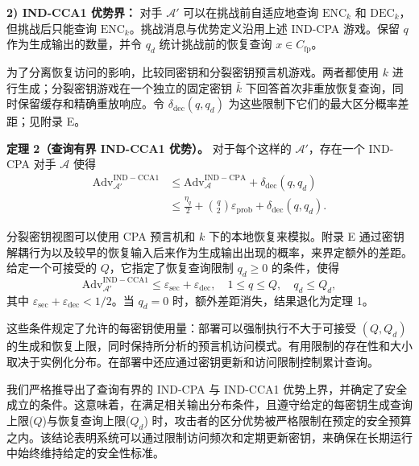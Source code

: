 \textbf{2) IND-CCA1 优势界：} 对手 \(\mathcal{A}'\) 可以在挑战前自适应地查询 \(\mathrm{ENC}_k\) 和 \(\mathrm{DEC}_k\)，但挑战后只能查询 \(\mathrm{ENC}_k\)。挑战消息与优势定义沿用上述 IND-CPA 游戏。保留 \(q\) 作为生成输出的数量，并令 \(q_d\) 统计挑战前的恢复查询 \(x \in C_{\mathrm{fp}}\)。

为了分离恢复访问的影响，比较同密钥和分裂密钥预言机游戏。两者都使用 \(k\) 进行生成；分裂密钥游戏在一个独立的固定密钥 \(\bar{k}\) 下回答首次非重放恢复查询，同时保留缓存和精确重放响应。令 \(\delta_{\mathrm{dec}}(q, q_d)\) 为这些限制下它们的最大区分概率差距；见附录 E。

\textbf{定理 2（查询有界 IND-CCA1 优势）。} 对于每个这样的 \(\mathcal{A}'\)，存在一个 IND-CPA 对手 \(\mathcal{A}\) 使得
\begin{equation}
\begin{aligned}
\mathrm{Adv}_{\mathcal{A}'}^{\mathrm{IND-CCA1}} &\le \mathrm{Adv}_{\mathcal{A}}^{\mathrm{IND-CPA}} + \delta_{\mathrm{dec}}(q, q_d) \\
&\le \frac{\eta_q}{2} + \binom{q}{2} \varepsilon_{\mathrm{prob}} + \delta_{\mathrm{dec}}(q, q_d).
\end{aligned} \tag{19}
\end{equation}

分裂密钥视图可以使用 CPA 预言机和 \(k\) 下的本地恢复来模拟。附录 E 通过密钥解耦行为以及较早的恢复输入后来作为生成输出出现的概率，来界定额外的差距。给定一个可接受的 \(Q\)，它指定了恢复查询限制 \(q_d \ge 0\) 的条件，使得
\begin{equation}
\mathrm{Adv}_{\mathcal{A}'}^{\mathrm{IND-CCA1}} \le \varepsilon_{\mathrm{sec}} + \varepsilon_{\mathrm{dec}}, \quad 1 \le q \le Q, \quad q_d \le Q_d, \tag{20}
\end{equation}
其中 \(\varepsilon_{\mathrm{sec}} + \varepsilon_{\mathrm{dec}} < 1/2\)。当 \(q_d = 0\) 时，额外差距消失，结果退化为定理 1。

这些条件规定了允许的每密钥使用量：部署可以强制执行不大于可接受 \((Q, Q_d)\) 的生成和恢复上限，同时保持所分析的预言机访问模式。有用限制的存在性和大小取决于实例化分布。在部署中还应通过密钥更新和访问限制控制累计查询。

我们严格推导出了查询有界的 IND-CPA 与 IND-CCA1 优势上界，并确定了安全成立的条件。这意味着，在满足相关输出分布条件，且遵守给定的每密钥生成查询上限($Q$)与恢复查询上限($Q_d$)
时，攻击者的区分优势被严格限制在预定的安全预算之内。该结论表明系统可以通过限制访问频次和定期更新密钥，来确保在长期运行中始终维持给定的安全性标准。